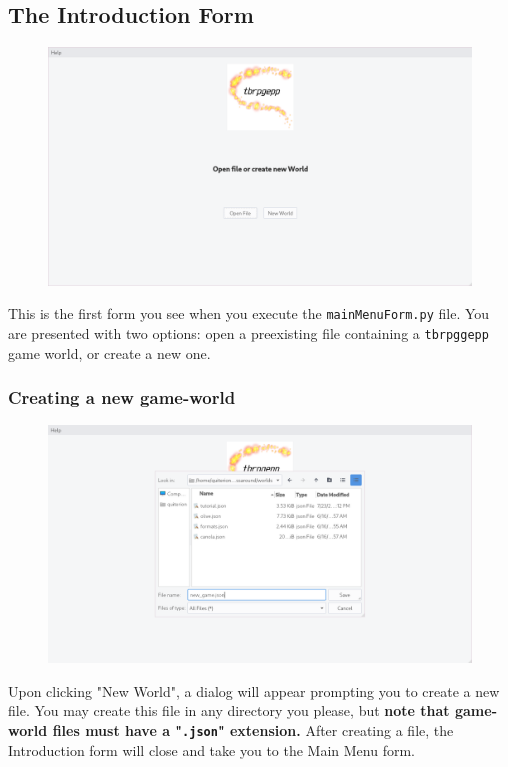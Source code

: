 \documentclass[class=article,crop=false]{standalone} \usepackage[margin=1in,headheight=57pt,headsep=0.1in]{geometry}
\begin{document}
\subsection{The Introduction Form}
\begin{figure}[H]
	\centering
	\includegraphics[width=1.0\textwidth]{./introForm.png}
\end{figure}
This is the first form you see when you execute the \texttt{mainMenuForm.py} file. You are presented with two options: open a preexisting file containing a \texttt{tbrpggepp} game world, or create a new one.
\subsubsection{Creating a new game-world}
\begin{figure}[H]
	\centering
	\includegraphics[width=1.0\textwidth]{./introFormWithFileDialog.png}
\end{figure}
Upon clicking "New World", a dialog will appear prompting you to create a new file. You may create this file in any directory you please, but \textbf{note that game-world files must have a "\texttt{.json}" extension.} After creating a file, the Introduction form will close and take you to the Main Menu form.
\end{document}

